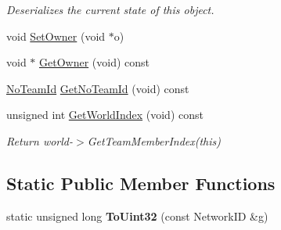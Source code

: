 \begin{DoxyCompactItemize}
\begin{DoxyCompactList}\small\item\em Deserializes the current state of this object. \end{DoxyCompactList}\item 
void \hyperlink{class_rak_net_1_1_t_m___team_member_a195772fb3ee3612ad244971f5611e8fc}{Set\-Owner} (void $\ast$o)
\item 
void $\ast$ \hyperlink{class_rak_net_1_1_t_m___team_member_a4742174a0be61be1535aa6b54bcaa90e}{Get\-Owner} (void) const 
\item 
\hyperlink{group___t_e_a_m___m_a_n_a_g_e_r___g_r_o_u_p_gadd1e99b7724ceb0f6794f46de31a6b02}{No\-Team\-Id} \hyperlink{class_rak_net_1_1_t_m___team_member_a6fa3ab92747b2455230789e10997f8ea}{Get\-No\-Team\-Id} (void) const 
\item 
\hypertarget{class_rak_net_1_1_t_m___team_member_a4a27ffc59241268111f174f8c43fe663}{unsigned int \hyperlink{class_rak_net_1_1_t_m___team_member_a4a27ffc59241268111f174f8c43fe663}{Get\-World\-Index} (void) const }\label{class_rak_net_1_1_t_m___team_member_a4a27ffc59241268111f174f8c43fe663}

\begin{DoxyCompactList}\small\item\em Return world-\/$>$Get\-Team\-Member\-Index(this) \end{DoxyCompactList}\end{DoxyCompactItemize}
\subsection*{Static Public Member Functions}
\begin{DoxyCompactItemize}
\item 
\hypertarget{class_rak_net_1_1_t_m___team_member_a782c1012875919a32fb8a2f052742211}{static unsigned long {\bfseries To\-Uint32} (const Network\-I\-D \&g)}\label{class_rak_net_1_1_t_m___team_member_a782c1012875919a32fb8a2f052742211}

\end{DoxyCompactItemize}
